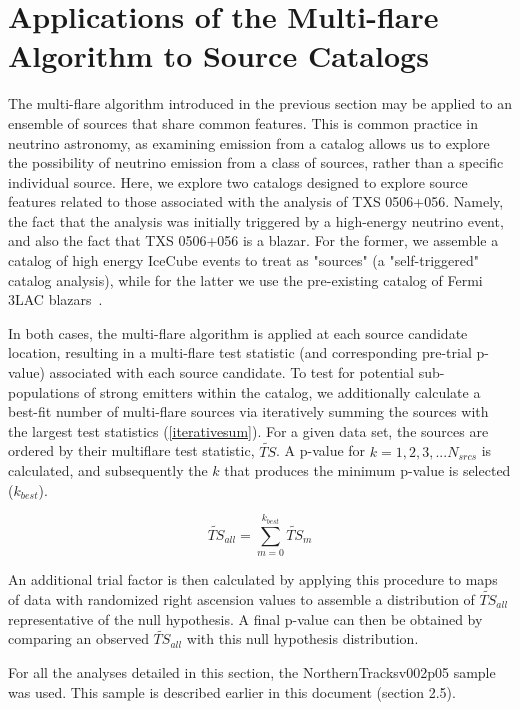 \chapter{Applications of the Multi-flare Algorithm to Source Catalogs}\label{chapter:catalogsearches}
The multi-flare algorithm introduced in the previous section may be applied to an ensemble of sources that share common features. This is common practice in neutrino astronomy, as examining emission from a catalog allows us to explore the possibility of neutrino emission from a class of sources, rather than a specific individual source. 
Here, we explore two catalogs designed to explore source features related to those associated with the analysis of TXS 0506+056. Namely, the fact that the analysis was initially triggered by a high-energy neutrino event, and also the fact that TXS 0506+056 is a blazar. For the former, we assemble a catalog of high energy IceCube events to treat as "sources" (a "self-triggered" catalog analysis), while for the latter we use the pre-existing catalog of Fermi 3LAC blazars~\cite{fermi_3lac}.

In both cases, the multi-flare algorithm is applied at each source candidate location, resulting in a multi-flare test statistic (and corresponding pre-trial p-value) associated with each source candidate.
To test for potential sub-populations of strong emitters within the catalog, we additionally calculate a best-fit number of multi-flare sources via iteratively summing the sources with the largest test statistics (\ref{iterativesum}). For a given data set, the sources are ordered by their multiflare test statistic, $\widetilde{TS}$. A p-value for $k=1,2,3,...N_{srcs}$ is calculated, and subsequently the $k$ that produces the minimum p-value is selected ($k_{best}$).

\begin{equation}
    \widetilde{TS}_{all} = \sum_{m=0}^{k_{best}}\widetilde{TS}_m
\label{iterativesum}
\end{equation}

An additional trial factor is then calculated by applying this procedure to maps of data with randomized right ascension values to assemble a distribution of $\widetilde{TS}_{all}$ representative of the null hypothesis. A final p-value can then be obtained by comparing an observed $\widetilde{TS}_{all}$ with this null hypothesis distribution. 

For all the analyses detailed in this section, the NorthernTracksv002p05 sample was used. This sample is described earlier in this document (section 2.5). 

